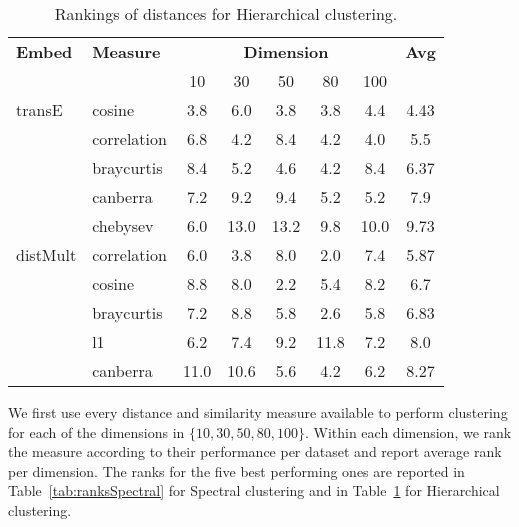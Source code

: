 		
\begin{table}
	\caption{Rankings of distances for Hierarchical clustering.}
		\label{tab:ranksHierarchical}
		\begin{tabular}{@{}llcccccc@{}}
				\toprule
				\textbf{Embed}		& \textbf{Measure}	& \multicolumn{5}{c}{\textbf{Dimension}}	& \textbf{Avg} \\
								\cmidrule(lr){3-7}
								&					&  10	& 30		& 50	& 80 	& 100		&				\\
								\midrule
				transE			& cosine				& 3.8	& 6.0	& 3.8	& 3.8	& 4.4		& 4.43			\\
								& correlation		& 6.8	& 4.2	& 8.4	& 4.2	& 4.0		& 5.5    \\
								& braycurtis			& 8.4	& 5.2	& 4.6	& 4.2	& 8.4		& 6.37		\\
								& canberra			& 7.2	& 9.2	& 9.4	& 5.2	& 5.2		& 7.9			\\
								& chebysev			& 6.0	& 13.0	& 13.2	& 9.8	& 10.0		& 9.73		\\
				distMult			& correlation		& 6.0	& 3.8	& 8.0	& 2.0	& 7.4		& 5.87				\\
								& cosine				& 8.8	& 8.0	& 2.2	& 5.4	& 8.2		& 6.7        \\
								& braycurtis			& 7.2	& 8.8	& 5.8	& 2.6	& 5.8		& 6.83			\\
								& l1				& 6.2	& 7.4	& 9.2	& 11.8	& 7.2		& 8.0			\\
								& canberra			& 11.0	& 10.6	& 5.6	& 4.2	& 6.2		& 8.27				\\
				\bottomrule	
				
			\end{tabular}
\end{table}	
		
	




We first use every distance and similarity measure available to perform clustering for each of the dimensions in $\{10, 30, 50, 80, 100\}$.
Within each dimension, we rank the measure according to their performance per dataset and report average rank per dimension.
The ranks for the five best performing ones are reported in Table~\ref{tab:ranksSpectral} for Spectral clustering and in Table~\ref{tab:ranksHierarchical} for Hierarchical clustering.



